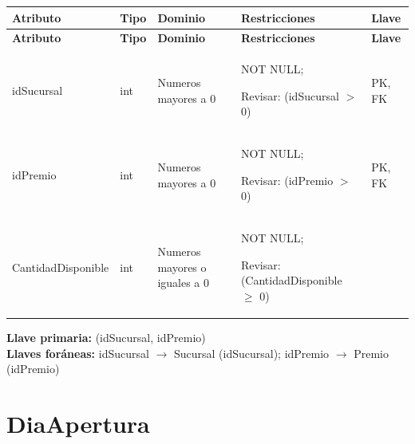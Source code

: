 \documentclass[12pt]{article}
\begin{document}
\begin{longtable}{p{3.5cm} p{2.2cm} p{4.8cm} p{4.2cm} p{1.2cm}}
\label{tab:almacenamiento}\\
\toprule
\textbf{Atributo} & \textbf{Tipo} & \textbf{Dominio} & \textbf{Restricciones} & \textbf{Llave} \\
\midrule
\endfirsthead

\toprule
\textbf{Atributo} & \textbf{Tipo} & \textbf{Dominio} & \textbf{Restricciones} & \textbf{Llave} \\
\midrule
\endhead

\bottomrule
\endfoot


idSucursal 
& int 
& Numeros mayores a 0
& NOT NULL;

Revisar: (idSucursal $>$ 0)
& PK, FK \\

idPremio 
& int 
& Numeros mayores a 0
& NOT NULL;

Revisar: (idPremio $>$ 0)
& PK, FK \\

CantidadDisponible 
& int 
& Numeros mayores o iguales a 0
& NOT NULL;

Revisar: (CantidadDisponible $\geq$ 0)
&  \\

\end{longtable}

\textbf{Llave primaria:} (idSucursal, idPremio)\\
\textbf{Llaves foráneas:} idSucursal $\rightarrow$ Sucursal (idSucursal); idPremio $\rightarrow$ Premio (idPremio)

 

\section*{DiaApertura}
\end{document}
